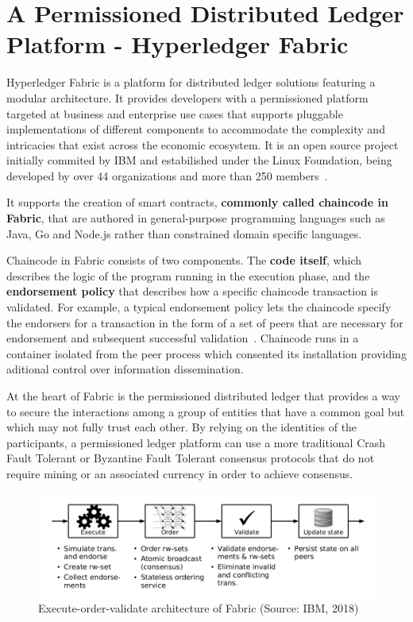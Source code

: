 \section{A Permissioned Distributed Ledger Platform - Hyperledger Fabric}
\label{distributedLedgerPlatform}

Hyperledger Fabric is a platform for distributed ledger solutions featuring a
modular architecture. It provides developers with a permissioned platform
targeted at business and enterprise use cases that supports pluggable
implementations of different components to accommodate the complexity and
intricacies that exist across the economic ecosystem. It is an open source
project initially commited by IBM  and estabilished under the Linux Foundation,
being developed by over 44 organizations and more than 250
members~\cite{HyperledgerFabricDocs2017,HyperledgerGrowth2018}.

It supports the creation of smart contracts, \textbf{commonly called chaincode
in Fabric}, that are authored in general-purpose programming languages such as
Java, Go and Node.js rather than constrained domain specific languages. 

Chaincode in Fabric consists of two components. The \textbf{code itself}, which
describes the logic of the program running in the execution phase, and the
\textbf{endorsement policy} that describes how a specific chaincode transaction
is validated. For example, a typical endorsement policy lets the chaincode
specify the endorsers for a transaction in the form of a set of peers that are
necessary for endorsement and subsequent successful
validation~\cite{Androulaki2018}. Chaincode runs in a container isolated from
the peer process which consented its installation providing aditional control
over information dissemination.

At the heart of Fabric is the permissioned distributed ledger that provides a
way to secure the interactions among a group of entities that have a common
goal but which may not fully trust each other. By relying on the identities of
the participants, a permissioned ledger platform can use a more traditional
Crash Fault Tolerant or Byzantine Fault Tolerant consensus protocols that do
not require mining or an associated currency in order to achieve consensus.

\begin{figure}[h]
  \centering
  \includegraphics[width=1\linewidth]{imgs/executeOrderValidate.png}
  \caption{\label{fig:executeorder} Execute-order-validate architecture of
  Fabric (Source: IBM, 2018)}
\end{figure}

